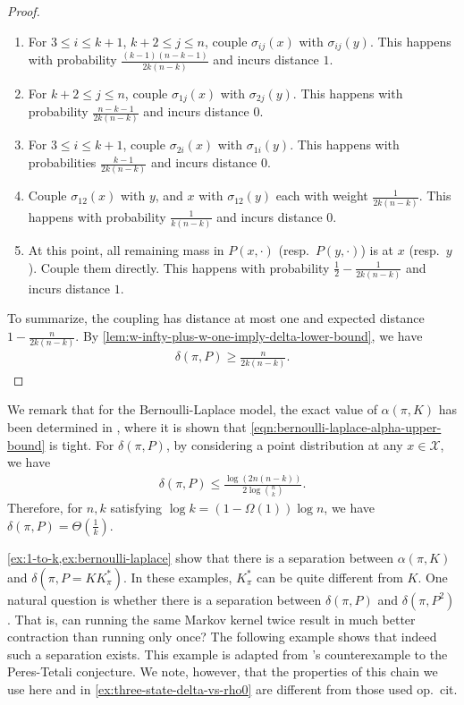 \documentclass[11pt]{article}
\def\cX{\mathcal{X}}
\theoremstyle{definition}
\begin{document}
\begin{proof}
  \begin{enumerate}[label=(\arabic*)]
    \item \label{item:bernoulli-laplace-coupling:i} For $3\le i\le k+1$, $k+2\le j\le n$, couple $\sigma_{ij}(x)$ with $\sigma_{ij}(y)$. This happens with probability $\frac{(k-1)(n-k-1)}{2k(n-k)}$ and incurs distance $1$.
    \item \label{item:bernoulli-laplace-coupling:ii} For $k+2\le j\le n$, couple $\sigma_{1j}(x)$ with $\sigma_{2j}(y)$. This happens with probability $\frac{n-k-1}{2k(n-k)}$ and incurs distance $0$.
    \item \label{item:bernoulli-laplace-coupling:iii} For $3\le i\le k+1$, couple $\sigma_{2i}(x)$ with $\sigma_{1i}(y)$. This happens with probabilities $\frac{k-1}{2k(n-k)}$ and incurs distance $0$.
    \item \label{item:bernoulli-laplace-coupling:iv} Couple $\sigma_{12}(x)$ with $y$, and $x$ with $\sigma_{12}(y)$ each with weight $\frac 1{2k(n-k)}$. This happens with probability $\frac{1}{k(n-k)}$ and incurs distance $0$.
    \item \label{item:bernoulli-laplace-coupling:v} At this point, all remaining mass in $P(x,\cdot)$ (resp.~$P(y,\cdot)$) is at $x$ (resp.~$y$). Couple them directly. This happens with probability $\frac 12 - \frac{1}{2k(n-k)}$ and incurs distance $1$.
  \end{enumerate}
  To summarize, the coupling has distance at most one and expected distance $1-\frac{n}{2k(n-k)}$.
  By \cref{lem:w-infty-plus-w-one-imply-delta-lower-bound}, we have
  \begin{align} \label{eqn:bernoulli-laplace-delta-lower-bound}
    \delta(\pi, P) \ge \frac{n}{2k(n-k)}.
  \end{align}
\end{proof}

We remark that for the Bernoulli-Laplace model, the exact value of $\alpha(\pi, K)$ has been determined in \cite[Theorem 1.12]{bristiel2024entropy}, where it is shown that \cref{eqn:bernoulli-laplace-alpha-upper-bound} is tight.
For $\delta(\pi, P)$, by considering a point distribution at any $x\in \cX$, we have
\begin{align} \label{eqn:bernoulli-laplace-delta-upper-bound}
  \delta(\pi, P) \le \frac{\log(2n(n-k))}{2 \log \binom nk}.
\end{align}
Therefore, for $n,k$ satisfying $\log k = (1-\Omega(1))\log n$, we have $\delta(\pi, P) = \Theta\left(\frac 1k\right)$.

\cref{ex:1-to-k,ex:bernoulli-laplace} show that there is a separation between $\alpha(\pi, K)$ and $\delta(\pi, P=KK_\pi^*)$. In these examples, $K_\pi^*$ can be quite different from $K$.
One natural question is whether there is a separation between $\delta(\pi, P)$ and $\delta\left(\pi, P^2\right)$. That is, can running the same Markov kernel twice result in much better contraction than running only once?
The following example shows that indeed such a separation exists. This example is adapted from \cite{Mun23}'s counterexample to the Peres-Tetali conjecture. We note, however, that the properties of this chain we use here and in \cref{ex:three-state-delta-vs-rho0} are different from those used op.~cit.
\end{document}
